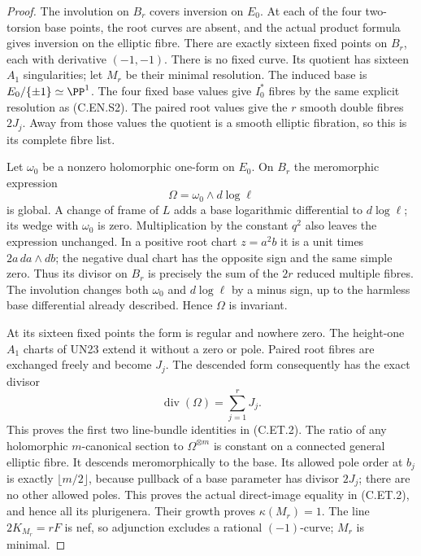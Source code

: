 \begin{proof}
The involution on $B_r$ covers inversion
on $E_0$. At each of the four two-torsion
base points, the root curves are absent,
and the actual product formula gives
inversion on the elliptic fibre.
There are exactly sixteen fixed points
on $B_r$, each with derivative $(-1,-1)$.
There is no fixed curve. Its quotient
has sixteen $A_1$ singularities; let
$M_r$ be their minimal resolution.
The induced base is
$E_0/\{\pm1\}\simeq\PP^1$.
The four fixed base values give $I_0^*$
fibres by the same explicit resolution
as (C.EN.S2). The paired root values
give the $r$ smooth double fibres
$2J_j$. Away from those values the
quotient is a smooth elliptic fibration,
so this is its complete fibre list.

Let $\omega_0$ be a nonzero holomorphic
one-form on $E_0$. On $B_r$ the
meromorphic expression
\[
                        \Omega=\omega_0\wedge d\log\ell
                                                               \tag{C.ET.9}
\]
is global. A change of frame of $L$
adds a base logarithmic differential
to $d\log\ell$; its wedge with
$\omega_0$ is zero. Multiplication
by the constant $q^2$ also leaves
the expression unchanged. In a
positive root chart $z=a^2b$ it is
a unit times $2a\,da\wedge db$;
the negative dual chart has the
opposite sign and the same simple
zero. Thus its divisor on $B_r$
is precisely the sum of the
$2r$ reduced multiple fibres.
The involution changes both
$\omega_0$ and $d\log\ell$ by a
minus sign, up to the harmless
base differential already described.
Hence $\Omega$ is invariant.

At its sixteen fixed points the form
is regular and nowhere zero. The
height-one $A_1$ charts of UN23
extend it without a zero or pole.
Paired root fibres are exchanged
freely and become $J_j$. The
descended form consequently has
the exact divisor
\[
                      \operatorname{div}(\Omega)
                                      =\sum_{j=1}^rJ_j .
                                                               \tag{C.ET.10}
\]
This proves the first two line-bundle
identities in (C.ET.2).
The ratio of any holomorphic
$m$-canonical section to
$\Omega^{\otimes m}$ is constant
on a connected general elliptic
fibre. It descends meromorphically
to the base. Its allowed pole
order at $b_j$ is exactly
$\lfloor m/2\rfloor$, because
pullback of a base parameter
has divisor $2J_j$; there are
no other allowed poles.
This proves the actual direct-image
equality in (C.ET.2), and hence
all its plurigenera.
Their growth proves $\kappa(M_r)=1$.
The line $2K_{M_r}=rF$ is nef,
so adjunction excludes a rational
$(-1)$-curve; $M_r$ is minimal.


\end{proof}

